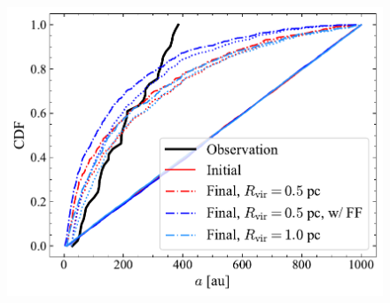 \documentclass[submission,phys]{lib/SciPost}
\begin{document}
\begin{figure}
    \centering
        \includegraphics[width=\columnwidth]{figures/Fractal_General_sem_axis_crop.pdf}
        \caption{}
        \label{Fig:sma_vs_time_model_ISF_Fr}
\end{figure}

    
\end{document}
